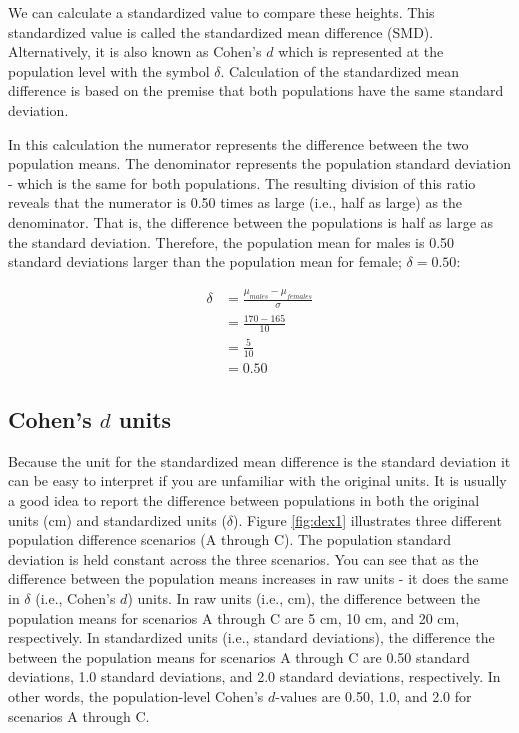 \documentclass[
]{krantz}
\begin{document}
We can calculate a standardized value to compare these heights. This standardized value is called the standardized mean difference (SMD). Alternatively, it is also known as Cohen's \(d\) which is represented at the population level with the symbol \(\delta\). Calculation of the standardized mean difference is based on the premise that both populations have the same standard deviation.

In this calculation the numerator represents the difference between the two population means. The denominator represents the population standard deviation - which is the same for both populations. The resulting division of this ratio reveals that the numerator is 0.50 times as large (i.e., half as large) as the denominator. That is, the difference between the populations is half as large as the standard deviation. Therefore, the population mean for males is 0.50 standard deviations larger than the population mean for female; \(\delta = 0.50\):

\[
\begin{aligned} 
\delta &=  \frac{\mu_{males} - \mu_{females}}{\sigma}\\ 
&=  \frac{170 - 165}{10}\\
&=  \frac{5}{10}\\
&= 0.50
\end{aligned} 
\]

\hypertarget{cohens-d-units}{%
\subsection{\texorpdfstring{Cohen's \(d\) units}{Cohen's d units}}\label{cohens-d-units}}

Because the unit for the standardized mean difference is the standard deviation it can be easy to interpret if you are unfamiliar with the original units. It is usually a good idea to report the difference between populations in both the original units (cm) and standardized units (\(\delta\)). Figure \ref{fig:dex1} illustrates three different population difference scenarios (A through C). The population standard deviation is held constant across the three scenarios. You can see that as the difference between the population means increases in raw units - it does the same in \(\delta\) (i.e., Cohen's \(d\)) units. In raw units (i.e., cm), the difference between the population means for scenarios A through C are 5 cm, 10 cm, and 20 cm, respectively. In standardized units (i.e., standard deviations), the difference the between the population means for scenarios A through C are 0.50 standard deviations, 1.0 standard deviations, and 2.0 standard deviations, respectively. In other words, the population-level Cohen's \(d\)-values are 0.50, 1.0, and 2.0 for scenarios A through C.
\end{document}
